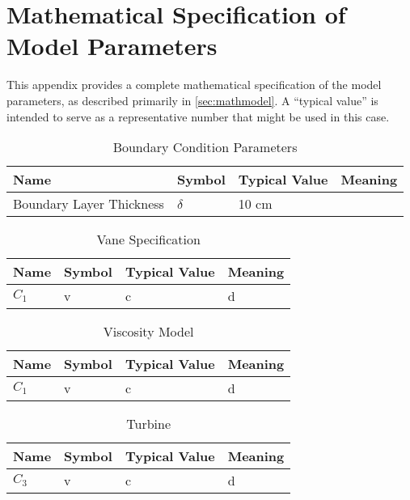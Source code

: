 \section{Mathematical Specification of Model Parameters}
\label{app:model_param}

This appendix provides a complete mathematical specification of the
model parameters, as described primarily in \ref{sec:mathmodel}. A
``typical value'' is intended to serve as a representative number that 
might be used in this case. 


%
%
%


%
%
%

\begin{table}[]
\centering
\caption{Boundary Condition Parameters}
\begin{tabular}{|l|l|l|l|}
\hline
Name                      & Symbol   & Typical Value & Meaning \\
\hline
Boundary Layer Thickness  & $\delta$ &  10 cm        &      \\
\hline
\end{tabular}
\label{my-label}
\end{table}

%
%
%
\begin{table}[]
\centering
\caption{Vane Specification}
\begin{tabular}{|l|l|l|l|}
\hline
Name & Symbol & Typical Value & Meaning \\
\hline
$C_1$     &   v     &      c         &    d     \\
\hline
\end{tabular}
\label{my-label}
\end{table}

%
%
%
\begin{table}[]
\centering
\caption{Viscosity Model}
\begin{tabular}{|l|l|l|l|}
\hline
Name & Symbol & Typical Value & Meaning \\
\hline
$C_1$     &   v     &      c         &    d     \\
\hline
\end{tabular}
\label{my-label}
\end{table}


%
%
\begin{table}[]
\centering
\caption{Turbine}
\begin{tabular}{|l|l|l|l|}
\hline
Name & Symbol & Typical Value & Meaning \\
\hline
$C_3$     &   v     &      c         &    d     \\
\hline
\end{tabular}
\label{my-label}
\end{table}

